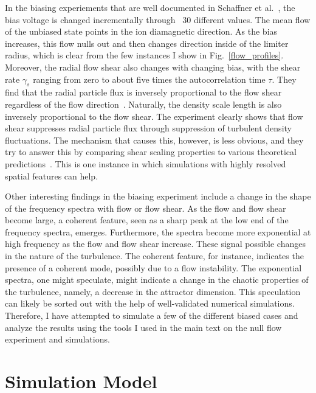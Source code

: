 In the biasing experiements that are well documented in Schaffner et al.~\cite{schaffner2012,schaffner2013}, the bias voltage is changed incrementally through ~30 different values. 
The mean flow of the unbiased state points in the ion diamagnetic direction. As the bias increases, this flow nulls out and then changes direction inside of the limiter radius, which is
clear from the few instances I show in Fig.~\ref{flow_profiles}. Moreover, the radial flow shear also changes with changing bias, with the shear rate $\gamma_s$ ranging from zero to about five times
the autocorrelation time $\tau$. They find that the radial particle flux is inversely proportional to the flow shear regardless of the flow direction~\cite{schaffner2012}. 
Naturally, the density scale length is also inversely proportional to the flow shear. The experiment clearly shows that flow shear suppresses radial particle flux through suppression of turbulent
density fluctuations. 
The mechanism that causes this, however, is less obvious, and they try to answer this by comparing shear scaling properties to various theoretical predictions~\cite{schaffner2013}.
This is one instance in which simulations with highly resolved spatial features can help.

Other interesting findings in the biasing experiment include a change in the shape of the frequency spectra with flow or flow shear. As the flow and flow shear become large, a coherent feature,
seen as a sharp peak at the low end of the frequency spectra, emerges. Furthermore, the spectra become more exponential at high frequency as the flow and flow shear increase. These signal
possible changes in the nature of the turbulence. The coherent feature, for instance, indicates the presence of a coherent mode, possibly due to a flow instability. The exponential spectra,
one might speculate, might indicate a change in the chaotic properties of the turbulence, namely, a decrease in the attractor dimension. This speculation can likely be sorted out with
the help of well-validated numerical simulations. Therefore, I have attempted to simulate a few of the different biased cases and analyze the results using the tools I used in the main
text on the null flow experiment and simulations.



\section{Simulation Model}
\label{s_sim_model}

